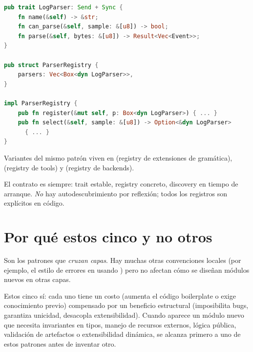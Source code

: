 \begin{lstlisting}[language=Rust]
pub trait LogParser: Send + Sync {
    fn name(&self) -> &str;
    fn can_parse(&self, sample: &[u8]) -> bool;
    fn parse(&self, bytes: &[u8]) -> Result<Vec<Event>>;
}

pub struct ParserRegistry {
    parsers: Vec<Box<dyn LogParser>>,
}

impl ParserRegistry {
    pub fn register(&mut self, p: Box<dyn LogParser>) { ... }
    pub fn select(&self, sample: &[u8]) -> Option<&dyn LogParser>
      { ... }
}
\end{lstlisting}

Variantes del mismo patrón viven en 
(registry de extensiones de gramática), 
(registry de tools) y  (registry de
backends).

El contrato es siempre: trait estable, registry concreto, discovery
en tiempo de arranque. \emph{No} hay autodescubrimiento por
reflexión; todos los registros son explícitos en código.

\section{Por qué estos cinco y no otros}

Son los patrones que \emph{cruzan capas}. Hay muchas otras
convenciones locales (por ejemplo, el estilo de errores en
 usando ) pero no afectan
cómo se diseñan módulos nuevos en otras capas.

Estos cinco sí: cada uno tiene un costo (aumenta el código
boilerplate o exige conocimiento previo) compensado por un
beneficio estructural (imposibilita bugs, garantiza unicidad,
desacopla extensibilidad). Cuando aparece un módulo nuevo que
necesita invariantes en tipos, manejo de recursos externos, lógica
pública, validación de artefactos o extensibilidad dinámica, se
alcanza primero a uno de estos patrones antes de inventar otro.
